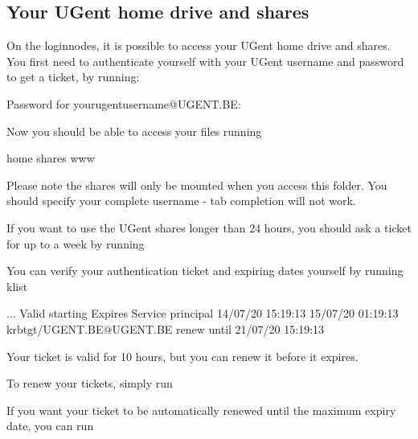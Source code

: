 \ifgent
\subsection{Your UGent home drive and shares \label{subsec:ugent-shares}}

On the loginnodes, it is possible to access your UGent home drive and shares.
You first need to authenticate yourself with your UGent username and password to get a ticket, by running:

\begin{prompt}
Password for yourugentusername@UGENT.BE:
\end{prompt}

Now you should be able to access your files running

\begin{prompt}
home  shares  www
\end{prompt}

Please note the shares will only be mounted when you access this folder.
You should specify your complete username - tab completion will not work.


If you want to use the UGent shares longer than 24 hours,
you should ask a ticket for up to a week by running

\begin{prompt}
\end{prompt}

You can verify your authentication ticket and expiring dates yourself by running klist

\begin{prompt}
...
Valid starting     Expires            Service principal
14/07/20 15:19:13  15/07/20 01:19:13  krbtgt/UGENT.BE@UGENT.BE
	renew until 21/07/20 15:19:13

\end{prompt}

Your ticket is valid for 10 hours, but you can renew it before it expires.

To renew your tickets, simply run

\begin{prompt}
\end{prompt}

If you want your ticket to be automatically renewed until the maximum expiry date, you can run

\begin{prompt}
\end{prompt}

